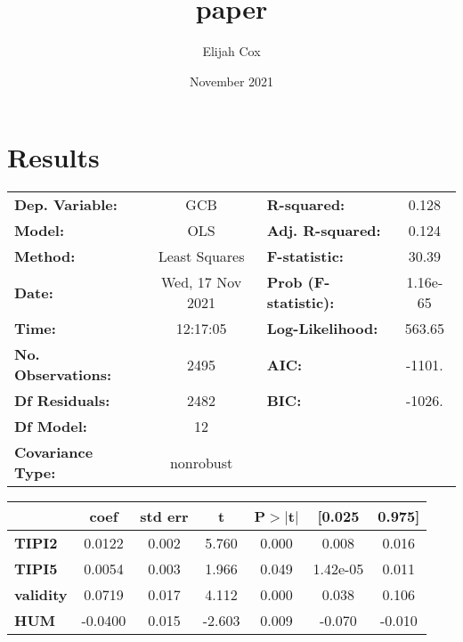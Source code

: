 \documentclass{article}
\title{paper}
\author{Elijah Cox}
\date{November 2021}
\begin{document}
\maketitle

\section{Results}
\begin{center}
\begin{tabular}{lclc}
\toprule
\textbf{Dep. Variable:}    &       GCB        & \textbf{  R-squared:         } &     0.128   \\
\textbf{Model:}            &       OLS        & \textbf{  Adj. R-squared:    } &     0.124   \\
\textbf{Method:}           &  Least Squares   & \textbf{  F-statistic:       } &     30.39   \\
\textbf{Date:}             & Wed, 17 Nov 2021 & \textbf{  Prob (F-statistic):} &  1.16e-65   \\
\textbf{Time:}             &     12:17:05     & \textbf{  Log-Likelihood:    } &    563.65   \\
\textbf{No. Observations:} &        2495      & \textbf{  AIC:               } &    -1101.   \\
\textbf{Df Residuals:}     &        2482      & \textbf{  BIC:               } &    -1026.   \\
\textbf{Df Model:}         &          12      & \textbf{                     } &             \\
\textbf{Covariance Type:}  &    nonrobust     & \textbf{                     } &             \\
\bottomrule
\end{tabular}
\begin{tabular}{lcccccc}
                        & \textbf{coef} & \textbf{std err} & \textbf{t} & \textbf{P$> |$t$|$} & \textbf{[0.025} & \textbf{0.975]}  \\
\midrule
\textbf{TIPI2}          &       0.0122  &        0.002     &     5.760  &         0.000        &        0.008    &        0.016     \\
\textbf{TIPI5}          &       0.0054  &        0.003     &     1.966  &         0.049        &     1.42e-05    &        0.011     \\
\textbf{validity}       &       0.0719  &        0.017     &     4.112  &         0.000        &        0.038    &        0.106     \\
\textbf{HUM}            &      -0.0400  &        0.015     &    -2.603  &         0.009        &       -0.070    &       -0.010     \\

\end{tabular}
\end{center}
\end{document}
